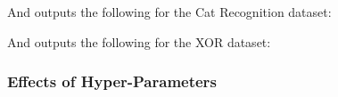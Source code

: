 \documentclass[./project-report/src/latex/project-report.tex]{subfiles}
\begin{document}
And outputs the following for the Cat Recognition dataset:

\pagebreak

\begin{figure}[h!]
\centering
{}
\end{figure}

And outputs the following for the XOR dataset:

\pagebreak

\begin{figure}[h!]
\centering
{}
\end{figure}

\subsubsection{Effects of Hyper-Parameters}
\end{document}
